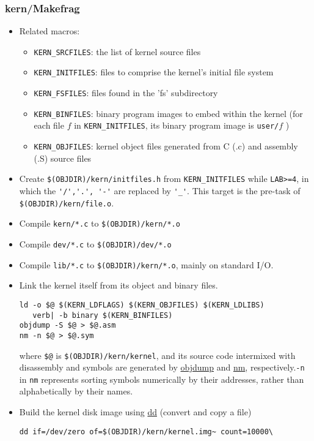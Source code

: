 \subsubsection{kern/Makefrag}
\begin{itemize}
\item Related macros: 
\begin{itemize}
\item \verb|KERN_SRCFILES|: the list of kernel source files 
\item \verb|KERN_INITFILES|: files to comprise the kernel's initial file system
\item \verb|KERN_FSFILES|: files found in the 'fs' subdirectory
\item \verb|KERN_BINFILES|: binary program images to embed within the kernel (for each file $f$ in \verb|KERN_INITFILES|, its binary program image is \verb|user/|$f$ )
\item \verb|KERN_OBJFILES|: kernel object files generated from C (.c) and assembly (.S) source files 
\end{itemize}
\item Create \verb|$(OBJDIR)/kern/initfiles.h| from \verb|KERN_INITFILES| while \verb|LAB>=4|, in which the \verb|'/','.', '-'| are replaced by \verb|'_'|. This target is the pre-task of \verb|$(OBJDIR)/kern/file.o|.
\item Compile \verb|kern/*.c| to \verb|$(OBJDIR)/kern/*.o|
\item Compile \verb|dev/*.c| to \verb|$(OBJDIR)/dev/*.o|
\item Compile \verb|lib/*.c| to \verb|$(OBJDIR)/kern/*.o|, mainly on standard I/O.
\item Link the kernel itself from its object and binary files.
\begin{verbatim}
ld -o $@ $(KERN_LDFLAGS) $(KERN_OBJFILES) $(KERN_LDLIBS)
   verb| -b binary $(KERN_BINFILES)
objdump -S $@ > $@.asm
nm -n $@ > $@.sym
\end{verbatim}
where \verb|$@| is \verb|$(OBJDIR)/kern/kernel|, and its source code intermixed with disassembly and symbols are generated by \href{http://linux.die.net/man/1/objdump}{objdump} and \href{http://linux.die.net/man/1/nm}{nm}, respectively.\verb|-n| in \verb|nm| represents sorting symbols numerically by their addresses, rather than alphabetically by their names. 
\item Build the kernel disk image using \href{http://linux.die.net/man/1/dd}{dd} (convert and copy a file)
\begin{verbatim}
dd if=/dev/zero of=$(OBJDIR)/kern/kernel.img~ count=10000\

\end{verbatim}
\end{itemize}
